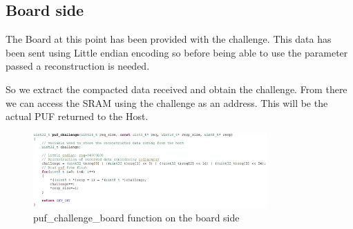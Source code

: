\subsection{Board side}

The Board at this point has been provided with the challenge. This data has been sent using Little endian encoding so before being able to use the parameter passed a reconstruction is needed.

So we extract the compacted data received and obtain the challenge. From there we can access the SRAM using the challenge as an address. This will be the actual PUF returned to the Host.

\begin{figure}[h!]
	\vspace{0.5cm}
	\includegraphics[width = 0.8\textwidth]{images/puf_challenge_board.png}
	\caption{puf\_challenge\_board function on the board side}
	\label{fig:puf_challenge_board}
\end{figure}
